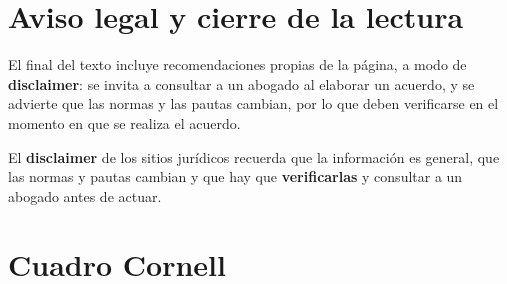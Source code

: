 \documentclass[12pt,oneside]{book}
\begin{document}
\section{Aviso legal y cierre de la lectura}

El final del texto incluye recomendaciones propias de la página, a modo de \textbf{disclaimer}: se invita a consultar a un abogado al elaborar un acuerdo, y se advierte que las normas y las pautas cambian, por lo que deben verificarse en el momento en que se realiza el acuerdo.

\begin{important}
El \textbf{disclaimer} de los sitios jurídicos recuerda que la información es general, que las normas y pautas cambian y que hay que \textbf{verificarlas} y consultar a un abogado antes de actuar.
\end{important}

\section{Cuadro Cornell}
\end{document}
